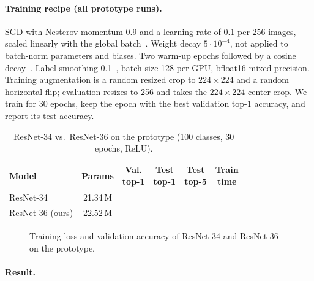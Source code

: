 \paragraph{Training recipe (all prototype runs).}
SGD with Nesterov momentum 0.9 and a learning rate of 0.1 per 256 images, scaled linearly with the global batch~\cite{goyal2017accurate}.
Weight decay $5\cdot10^{-4}$, not applied to batch-norm parameters and biases.
Two warm-up epochs followed by a cosine decay~\cite{loshchilov2017sgdr}.
Label smoothing 0.1~\cite{szegedy2016inception}, batch size 128 per GPU, bfloat16 mixed precision.
Training augmentation is a random resized crop to $224\times224$ and a random horizontal flip; evaluation resizes to 256 and takes the $224\times224$ center crop.
We train for 30 epochs, keep the epoch with the best validation top-1 accuracy, and report its test accuracy.

\begin{table}[t]
  \centering
  \small
  \setlength{\tabcolsep}{4pt}
  \begin{tabular}{@{}lccccc@{}}
    \toprule
    Model & Params & \makecell{Val.\\top-1} & \makecell{Test\\top-1} & \makecell{Test\\top-5} & \makecell{Train\\time} \\
    \midrule
    ResNet-34 & 21.34\,M & \todo{--} & \todo{--} & \todo{--} & \todo{--} \\
    ResNet-36 (ours) & 22.52\,M & \todo{--} & \todo{--} & \todo{--} & \todo{--} \\
    \bottomrule
  \end{tabular}
  \caption{ResNet-34 vs.\ ResNet-36 on the prototype (100 classes, 30 epochs, ReLU). }
  \label{tab:p3-depth}
\end{table}

\begin{figure}[t]
  \centering
  \caption{Training loss and validation accuracy of ResNet-34 and ResNet-36 on the prototype.}
  \label{fig:p3-depth}
\end{figure}

\paragraph{Result.}

